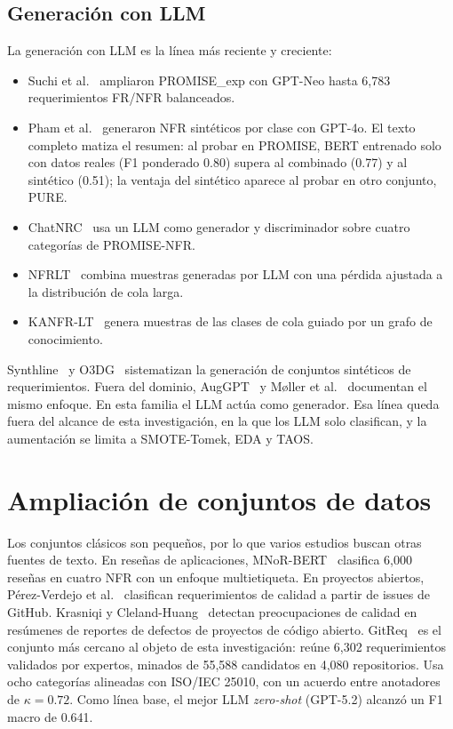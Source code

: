 \documentclass[conference]{IEEEtran}
\begin{document}
\subsection{Generación con LLM}
La generación con LLM es la línea más reciente y creciente:
\begin{itemize}
  \item Suchi et al.~\cite{Suchi2024-Explainable} ampliaron PROMISE\_exp con GPT-Neo hasta 6,783 requerimientos FR/NFR balanceados.
  \item Pham et al.~\cite{Pham2025-Generating} generaron NFR sintéticos por clase con GPT-4o. El texto completo matiza el resumen: al probar en PROMISE, BERT entrenado solo con datos reales (F1 ponderado 0.80) supera al combinado (0.77) y al sintético (0.51); la ventaja del sintético aparece al probar en otro conjunto, PURE.
  \item ChatNRC~\cite{Qin2025-ChatNRC} usa un LLM como generador y discriminador sobre cuatro categorías de PROMISE-NFR.
  \item NFRLT~\cite{Wang2025-Learning} combina muestras generadas por LLM con una pérdida ajustada a la distribución de cola larga.
  \item KANFR-LT~\cite{Peng2026-Knowledge} genera muestras de las clases de cola guiado por un grafo de conocimiento.
\end{itemize}
Synthline~\cite{ElHajjami2025-Synthline} y O3DG~\cite{Bishop2026-demand} sistematizan la generación de conjuntos sintéticos de requerimientos. Fuera del dominio, AugGPT~\cite{Dai2023-AugGPT} y Møller et al.~\cite{Moller2023-Parrot} documentan el mismo enfoque. En esta familia el LLM actúa como generador. Esa línea queda fuera del alcance de esta investigación, en la que los LLM solo clasifican, y la aumentación se limita a SMOTE-Tomek, EDA y TAOS.

\section{Ampliación de conjuntos de datos}\label{sec:ampliacion}
Los conjuntos clásicos son pequeños, por lo que varios estudios buscan otras fuentes de texto. En reseñas de aplicaciones, MNoR-BERT~\cite{Kaur2023-MNoRBERT} clasifica 6,000 reseñas en cuatro NFR con un enfoque multietiqueta. En proyectos abiertos, Pérez-Verdejo et al.~\cite{PerezVerdejo2021-GitHubIssues} clasifican requerimientos de calidad a partir de issues de GitHub. Krasniqi y Cleland-Huang~\cite{Krasniqi2021-Analyzing} detectan preocupaciones de calidad en resúmenes de reportes de defectos de proyectos de código abierto. GitReq~\cite{Kamal2026-GitReq} es el conjunto más cercano al objeto de esta investigación: reúne 6,302 requerimientos validados por expertos, minados de 55,588 candidatos en 4,080 repositorios. Usa ocho categorías alineadas con ISO/IEC 25010, con un acuerdo entre anotadores de $\kappa=0.72$. Como línea base, el mejor LLM \emph{zero-shot} (GPT-5.2) alcanzó un F1 macro de 0.641.
\end{document}
